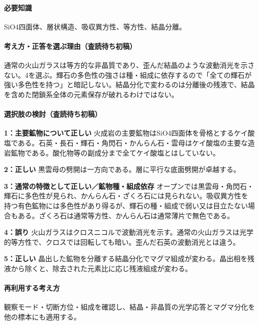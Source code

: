 \paragraph{必要知識} SiO4四面体、層状構造、吸収異方性、等方性、結晶分離。

\paragraph{考え方・正答を選ぶ理由（査読待ち初稿）} 通常の火山ガラスは等方的な非晶質であり、歪んだ結晶のような波動消光を示さない。4を選ぶ。輝石の多色性の強さは種・組成に依存するので「全ての輝石が強い多色性を持つ」と暗記しない。結晶分化で変わるのは分離後の残液で、結晶を含めた閉鎖系全体の元素保存が破れるわけではない。

\paragraph{選択肢の検討（査読待ち初稿）}\mbox{}\par

\noindent\textbf{1：主要鉱物について正しい} 火成岩の主要鉱物はSiO4四面体を骨格とするケイ酸塩である。石英・長石・輝石・角閃石・かんらん石・雲母はケイ酸塩の主要な造岩鉱物である。酸化物等の副成分まで全てケイ酸塩とはしていない。\par

\noindent\textbf{2：正しい} 黒雲母の劈開は一方向である。層に平行な底面劈開が卓越する。\par

\noindent\textbf{3：通常の特徴として正しい／鉱物種・組成依存} オープンでは黒雲母・角閃石・輝石に多色性が見られ、かんらん石・ざくろ石には見られない。吸収異方性を持つ有色鉱物には多色性があり得るが、輝石の種・組成で弱い又は目立たない場合もある。ざくろ石は通常等方性、かんらん石は通常薄片で無色である。\par

\noindent\textbf{4：誤り} 火山ガラスはクロスニコルで波動消光を示す。通常の火山ガラスは光学的等方性で、クロスでは回転しても暗い。歪んだ石英の波動消光とは違う。\par

\noindent\textbf{5：正しい} 晶出した鉱物を分離する結晶分化でマグマ組成が変わる。晶出相を残液から除くと、除去された元素比に応じ残液組成が変わる。\par

\paragraph{再利用する考え方} 観察モード・切断方位・組成を確認し、結晶・非晶質の光学応答とマグマ分化を他の標本にも適用する。

